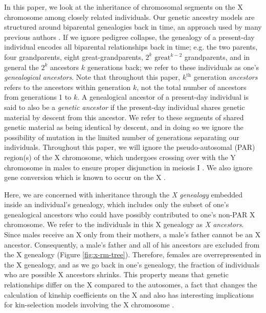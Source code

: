 \documentclass[11pt]{article}
\begin{document}
In this paper, we look at the inheritance of chromosomal segments on the X
chromosome among closely related individuals. Our genetic ancestry models are
structured around biparental genealogies back in time, an approach used by many
previous authors \citep[e.g.,][]{Donnelly:1983fi,
chang1999recent,Barton:2011iq,Rohde:2004kl}. If we ignore pedigree collapse,
the genealogy of a present-day individual encodes all biparental relationships
back in time; e.g. the two parents, four grandparents, eight
great-grandparents, $2^k$ $\text{great}^{k-2}$ grandparents, and in general the
$2^k$ ancestors $k$ generations back; we refer to these individuals as one's
\emph{genealogical ancestors}. Note that throughout this paper, $k^\text{th}$
generation \emph{ancestors} refers to the ancestors within generation $k$, not
the total number of ancestors from generations 1 to $k$. A genealogical
ancestor of a present-day individual is said to also be a \emph{genetic
ancestor} if the present-day individual shares genetic material by descent from
this ancestor.  We refer to these segments of shared genetic material as being
identical by descent, and in doing so we ignore the possibility of mutation in
the limited number of generations separating our individuals. Throughout this
paper, we will ignore the pseudo-autosomal (PAR) region(s) of the X chromosome,
which undergoes crossing over with the Y chromosome in males
\citep{koller1934genetical} to ensure proper disjunction in meiosis I
\citep{hassold1991xy}. We also ignore gene conversion which is known to occur
on the X \citep{Rosser:2009df}. 

Here, we are concerned with inheritance through the \emph{X genealogy} embedded
inside an individual's genealogy, which includes only the subset of one's
genealogical ancestors who could have possibly contributed to one's non-PAR X
chromosome. We refer to the individuals in this X genealogy as \emph{X
ancestors}. Since males receive an X only from their mothers, a male's father
cannot be an X ancestor. Consequently, a male's father and all of his ancestors
are excluded from the X genealogy (Figure \ref{fig:x-rm-tree}). Therefore,
females are overrepresented in the X genealogy, and as we go back in one's
genealogy, the fraction of individuals who are possible X ancestors shrinks.
This property means that genetic relationships differ on the X compared to the
autosomes, a fact that changes the calculation of kinship coefficients on the X
\citep{pinto2012general,pinto2011x} and also has interesting implications for
kin-selection models involving the X chromosome
\citep{Fox:2009kh,rice2008sexually}.
\end{document}
